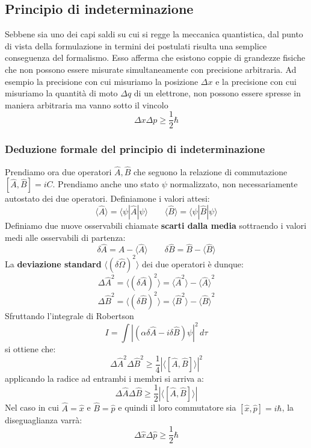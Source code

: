 \subsection{Principio di indeterminazione}
Sebbene sia uno dei capi saldi su cui si regge la meccanica quantistica, dal punto di vista della formulazione in termini dei postulati risulta una semplice conseguenza del formalismo. Esso afferma che esistono coppie di grandezze fisiche che non possono essere misurate simultaneamente con precisione arbitraria. Ad esempio la precisione con cui misuriamo la posizione $\Delta x$ e la precisione con cui misuriamo la quantità di moto $\Delta q$ di un elettrone, non possono essere spresse in maniera arbitraria ma vanno sotto il vincolo
$$ \Delta x \Delta p \ge \frac{1}{2} \hbar$$

\subsubsection{Deduzione formale del principio di indeterminazione}
Prendiamo ora due operatori $\hat{A}, \hat{B}$ che seguono la relazione di commutazione $[\hat{A}, \hat{B}] = iC$. Prendiamo anche uno stato $\psi$ normalizzato, non necessariamente autostato dei due operatori. Definiamone i valori attesi:
$$\langle \hat{A} \rangle = \langle \psi | \hat{A} | \psi \rangle \qquad \langle \hat{B} \rangle = \langle \psi | \hat{B} | \psi \rangle$$
Definiamo due nuove osservabili chiamate \textbf{scarti dalla media} sottraendo i valori medi alle osservabili di partenza:
$$\delta \hat{A} = \hat{A} - \langle \hat{A} \rangle \qquad \delta \hat{B} = \hat{B} - \langle \hat{B} \rangle$$
La \textbf{deviazione standard} $\langle (\delta\hat{\Omega})^2 \rangle$ dei due operatori è dunque:
$${\Delta \hat{A}}^2 = \langle (\delta \hat{A})^2 \rangle = \langle \hat{A}^2 \rangle - {\langle \hat{A} \rangle}^2 $$
$${\Delta \hat{B}}^2 = \langle (\delta \hat{B})^2 \rangle = \langle \hat{B}^2 \rangle - {\langle \hat{B} \rangle}^2$$
Sfruttando l'integrale di Robertson
$$ I = \int {|(\alpha \delta \hat{A} - i \delta \hat{B})\psi|}^2 \, d\tau$$
si ottiene che:
$$ {\Delta \hat{A}}^2 {\Delta \hat{B}}^2 \ge \frac{1}{4} {|\langle[\hat{A}, \hat{B}]\rangle|}^2$$
applicando la radice ad entrambi i membri si arriva a:
$$ \Delta \hat{A} \Delta \hat{B} \ge \frac{1}{2} |\langle[\hat{A}, \hat{B}]\rangle|$$
Nel caso in cui $\hat{A} = \hat{x}$ e $\hat{B} = \hat{p}$ e quindi il loro commutatore sia $[\hat{x}, \hat{p}] = i \hbar$, la diseguaglianza varrà:
$$ \Delta \hat{x} \Delta \hat{p} \ge \frac{1}{2} \hbar$$
